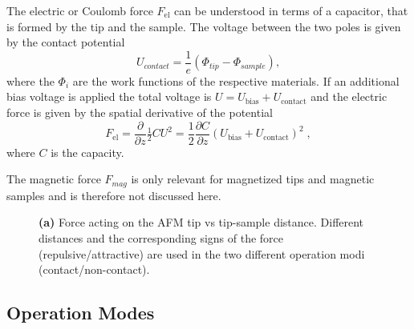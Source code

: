 \documentclass[a4paper]{scrartcl}
\numberwithin{equation}{section}
\numberwithin{figure}{section}
\numberwithin{table}{section}
\begin{document}
The electric or Coulomb force $F_\text{el}$ can be understood in terms of a capacitor, that is formed by the tip and the sample. The voltage between the two poles is given by the contact potential
\begin{equation}
U_{contact}=\frac{1}{e}\left(\Phi_{tip}-\Phi_{sample}\right),
\end{equation}
where the $\Phi_i$ are the work functions of the respective materials. If an additional bias voltage is applied the total voltage is $U=U_\text{bias}+U_\text{contact}$ and the electric force is given by the spatial derivative of the potential 
\begin{equation}
F_\text{el}=\frac{\partial }{\partial z} \tfrac 1 2 C U^2 = \frac{1}{2} \frac{\partial C}{\partial z} (U_\text{bias}+U_\text{contact})^2 \; , \label{eq:elec}
\end{equation}
where $C$ is the capacity.

The magnetic force $F_{mag}$ is only relevant for magnetized tips and magnetic samples and is therefore not discussed here. 

\begin{figure} 
 \centering
{}
\caption{
\small \textbf{(a)} Force acting on the AFM tip vs tip-sample distance. Different distances and the corresponding signs of the force (repulsive/attractive) are used in the two different operation modi (contact/non-contact). } 
	\label{fig:forces}
\end{figure}

\subsection{Operation Modes}  
\end{document}
